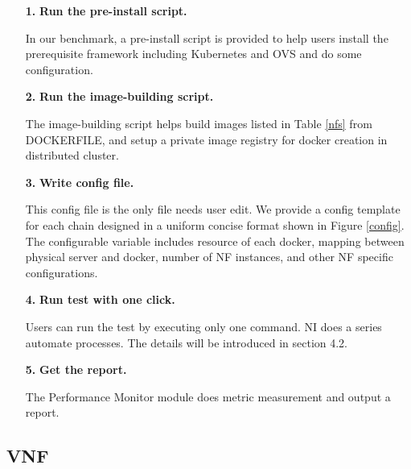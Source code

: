 \begin{itemize}
\item[\textbf{1.}]{}\textbf{Run the pre-install script.}

In our benchmark, a pre-install script is provided to
help users install the prerequisite framework including Kubernetes and OVS
and do some configuration.

\item[\textbf{2.}]{}\textbf{Run the image-building script.}

The image-building script helps build images listed in Table \ref{nfs} from DOCKERFILE, and setup a private image registry
for docker creation in distributed cluster.

\item[\textbf{3.}]{}\textbf{Write config file.}

This config file is the only file needs user edit.
We provide a config template for each chain
designed in a uniform concise format shown in Figure \ref{config}.
The configurable variable includes resource of each docker,
mapping between physical server and docker,
number of NF instances, and other NF specific configurations.

\item[\textbf{4.}]{}\textbf{Run test with one click.}

Users can run the test by executing only one command.
NI does a series automate processes.
The details will be introduced in section 4.2.

\item[\textbf{5.}]{}\textbf{Get the report.}

The Performance Monitor module does metric measurement
and output a report.

\end{itemize}


\subsection{VNF}

